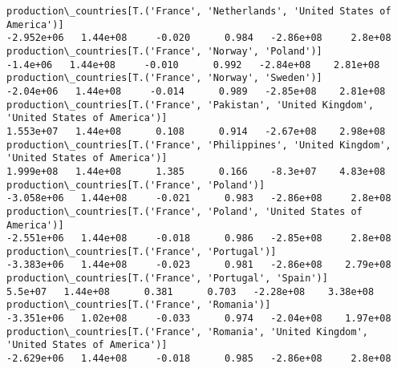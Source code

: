\documentclass[11pt]{article}
\begin{document}
\begin{Verbatim}[commandchars=\\\{\}]
production\_countries[T.('France', 'Netherlands', 'United States of America')]                                                                                                         -2.952e+06   1.44e+08     -0.020      0.984   -2.86e+08     2.8e+08
production\_countries[T.('France', 'Norway', 'Poland')]                                                                                                                                  -1.4e+06   1.44e+08     -0.010      0.992   -2.84e+08    2.81e+08
production\_countries[T.('France', 'Norway', 'Sweden')]                                                                                                                                 -2.04e+06   1.44e+08     -0.014      0.989   -2.85e+08    2.81e+08
production\_countries[T.('France', 'Pakistan', 'United Kingdom', 'United States of America')]                                                                                           1.553e+07   1.44e+08      0.108      0.914   -2.67e+08    2.98e+08
production\_countries[T.('France', 'Philippines', 'United Kingdom', 'United States of America')]                                                                                        1.999e+08   1.44e+08      1.385      0.166    -8.3e+07    4.83e+08
production\_countries[T.('France', 'Poland')]                                                                                                                                          -3.058e+06   1.44e+08     -0.021      0.983   -2.86e+08     2.8e+08
production\_countries[T.('France', 'Poland', 'United States of America')]                                                                                                              -2.551e+06   1.44e+08     -0.018      0.986   -2.85e+08     2.8e+08
production\_countries[T.('France', 'Portugal')]                                                                                                                                        -3.383e+06   1.44e+08     -0.023      0.981   -2.86e+08    2.79e+08
production\_countries[T.('France', 'Portugal', 'Spain')]                                                                                                                                  5.5e+07   1.44e+08      0.381      0.703   -2.28e+08    3.38e+08
production\_countries[T.('France', 'Romania')]                                                                                                                                         -3.351e+06   1.02e+08     -0.033      0.974   -2.04e+08    1.97e+08
production\_countries[T.('France', 'Romania', 'United Kingdom', 'United States of America')]                                                                                           -2.629e+06   1.44e+08     -0.018      0.985   -2.86e+08     2.8e+08

\end{Verbatim}
\end{document}
